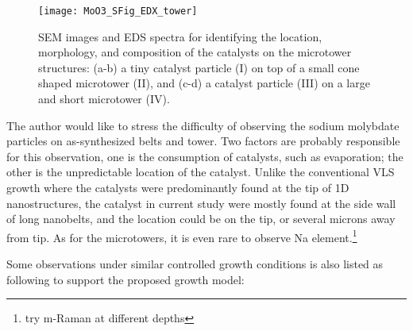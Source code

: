 \begin{figure}[htb]
\centering
\texttt{[image: MoO3\_SFig\_EDX\_tower]}
\caption[Growth evolution of : second stage]{SEM images and EDS spectra for identifying the location, morphology, and composition of the catalysts on the microtower structures: (a-b) a tiny catalyst particle (I) on top of a small cone shaped microtower (II), and (c-d) a catalyst particle (III) on a large and short microtower (IV).}
\label{fig:ch4edx2}
\end{figure}

The author would like to stress the difficulty of observing the sodium molybdate particles on as-synthesized belts and tower. Two factors are probably responsible for this observation, one is the consumption of catalysts, such as evaporation; the other is the unpredictable location of the catalyst. Unlike the conventional VLS growth where the catalysts were predominantly found at the tip of 1D nanostructures, the catalyst in current study were mostly found at the side wall of long nanobelts, and the location could be on the tip, or several microns away from tip. As for the microtowers, it is even rare to observe Na element.\footnote{try m-Raman at different depths} 

Some observations under similar controlled growth conditions is also listed as following to support the proposed growth model: 

